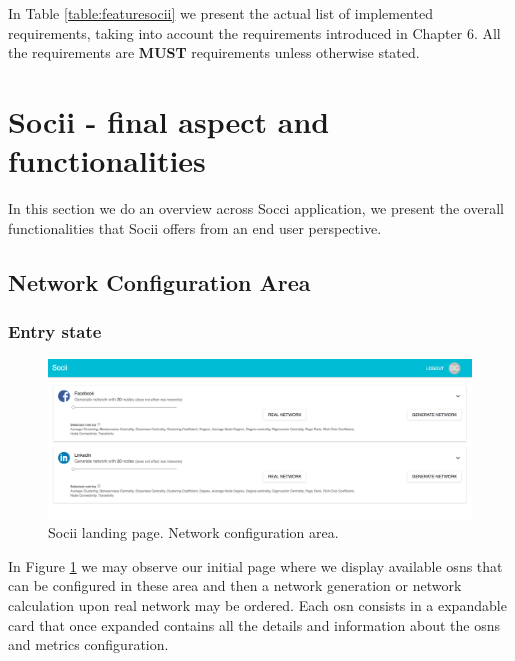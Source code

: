 In Table \ref{table:featuresocii} we present the actual list of implemented requirements, taking into account the requirements introduced in Chapter 6. All the requirements are \textbf{MUST} requirements unless otherwise stated.

\section{Socii - final aspect and functionalities}
In this section we do an overview across Socci application, we present the overall functionalities that Socii offers
from an end user perspective.

\subsection{Network Configuration Area}

\subsubsection*{Entry state}

\begin{figure}[h!]
\begin{center}
  \hspace*{-0.8in}
  \includegraphics[width=1.2\textwidth]{img/socii/socii_1.png}
\end{center}
\caption{\label{img:socii_1} Socii landing page. Network configuration area.}
\end{figure}

In Figure \ref{img:socii_1} we may observe our initial page where we display available \glspl{osn} that can be configured in these area and then a network generation or network calculation upon real network may be ordered. Each \gls{osn} consists in a expandable card that once expanded contains all the details and information about the \glspl{osn} and metrics configuration.

